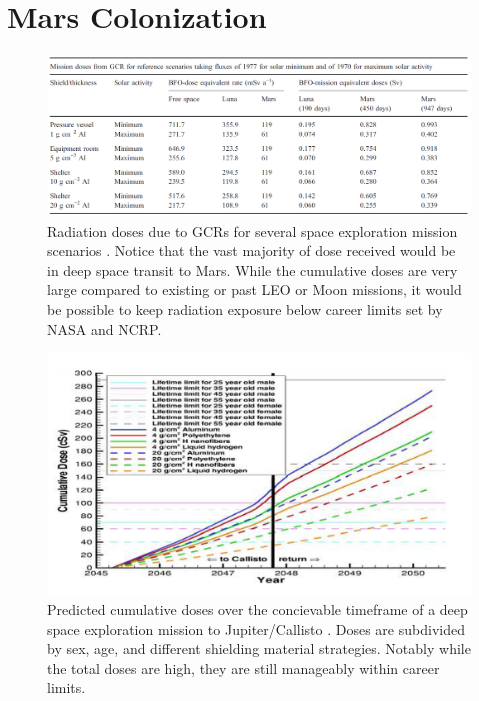 \section{Mars Colonization}

\begin{figure}
\centering
\includegraphics[width=\linewidth]{hellwig-doses.png}
\caption{Radiation doses due to GCRs for several space exploration mission scenarios \cite{hellwig-estimates}. Notice that the vast majority of dose received would be in deep space transit to Mars. While the cumulative doses are very large compared to existing or past LEO or Moon missions, it would be possible to keep radiation exposure below career limits set by NASA and NCRP.}
\label{fig:hellwig}
\end{figure}

\begin{figure}
\centering
\includegraphics[width=\linewidth]{deangelis-doses.png}
\caption{Predicted cumulative doses over the concievable timeframe of a deep space exploration mission to Jupiter/Callisto \cite{deangelis-scenarios}. Doses are subdivided by sex, age, and different shielding material strategies. Notably while the total doses are high, they are still manageably within career limits.}
\label{fig:deangelis}
\end{figure}

